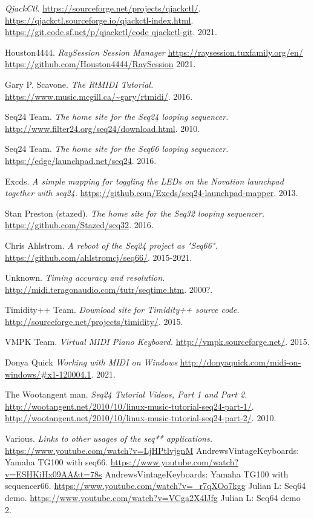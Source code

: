 {\begin{thebibliography}{99}
   \emph{QjackCtl.}
   \url{https://sourceforge.net/projects/qjackctl/}.
   \url{https://qjackctl.sourceforge.io/qjackctl-index.html}.
   \url{https://git.code.sf.net/p/qjackctl/code qjackctl-git}.
   2021.

   Houston4444.
   \emph{RaySession Session Manager}
   \url{https://raysession.tuxfamily.org/en/}
   \url{https://github.com/Houston4444/RaySession}
   2021.

   Gary P. Scavone.
   \emph{The RtMIDI Tutorial.}
   \url{https://www.music.mcgill.ca/~gary/rtmidi/}.
   2016.

   Seq24 Team.
   \emph{The home site for the Seq24 looping sequencer.}
   \url{http://www.filter24.org/seq24/download.html}.
   2010.

   Seq24 Team.
   \emph{The home site for the Seq66 looping sequencer.}
   \url{https://edge/launchpad.net/seq24}.
   2016.

   Excds.
   \emph{A simple mapping for toggling the LEDs on the Novation launchpad
   together with seq24.}
   \url{https://github.com/Excds/seq24-launchpad-mapper}.
   2013.

   Stan Preston (stazed).
   \emph{The home site for the Seq32 looping sequencer.}
   \url{https://github.com/Stazed/seq32}.
   2016.

   Chris Ahlstrom.
   \emph{A reboot of the Seq24 project as "Seq66".}
   \url{https://github.com/ahlstromcj/seq66/}.
   2015-2021.

   Unknown.
   \emph{Timing accuracy and resolution.}
   \url{http://midi.teragonaudio.com/tutr/seqtime.htm}.
   2000?.

   Timidity++ Team.
   \emph{Download site for Timidity++ source code.}
   \url{http://sourceforge.net/projects/timidity/}.
   2015.

   VMPK Team.
   \emph{Virtual MIDI Piano Keyboard.}
   \url{http://vmpk.sourceforge.net/}.
   2015.

   Donya Quick
   \emph{Working with MIDI on Windows}
   \url{http://donyaquick.com/midi-on-windows/#x1-120004.1}.
   2021.

   The Wootangent man.
   \emph{Seq24 Tutorial Videos, Part 1 and Part 2.}
   \url{http://wootangent.net/2010/10/linux-music-tutorial-seq24-part-1/}.
   \url{http://wootangent.net/2010/10/linux-music-tutorial-seq24-part-2/}.
   2010.

   Various.
   \emph{Links to other usages of the seq** applications.}
   \url{https://www.youtube.com/watch?v=LjHPtlvjgnM}
      AndrewsVintageKeyboards: Yamaha TG100 with seq66.
   \url{https://www.youtube.com/watch?v=ESHKiHx09AA&t=78s}
      AndrewsVintageKeyboards: Yamaha TG100 with sequencer66.
   \url{https://www.youtube.com/watch?v=\_r7qXOo7kgg}
      Julian L: Seq64 demo.
   \url{https://www.youtube.com/watch?v=VCga2X4lJfg}
      Julian L: Seq64 demo 2.
\end{thebibliography}
}

